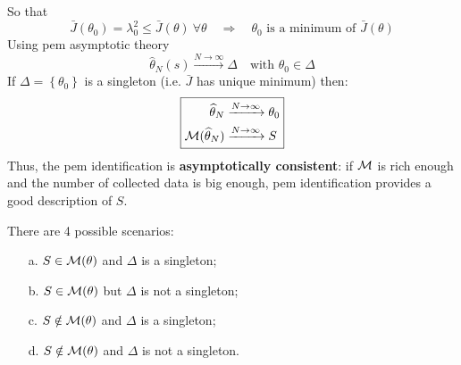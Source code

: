So that
\begin{equation*}
\bar{J}\left(\theta _{0}\right) = \lambda _{0}^{2} \leq \bar{J}(\theta)\  \forall \theta \quad\Longrightarrow\quad \theta _{0} \text{ is a minimum of } \bar{J}(\theta)
\end{equation*}
Using \gls{pem} asymptotic theory
\begin{equation*}
\hat{\theta}_{N}(s) \xrightarrow{N\to\infty} \Delta \quad \text{with }\theta_{0} \in \Delta 
\end{equation*}
If $ \Delta =\left\{\theta _{0}\right\}$ is a singleton (i.e. $ \bar{J}$ has unique minimum) then:
\[
	\boxed{
		\begin{aligned}
			\widehat{\theta }_{N} & \xrightarrow{N\rightarrow \infty} \theta _{0}\\
			\mathcal{M}(\widehat{\theta }_{N}) & \xrightarrow{N\rightarrow \infty} S
		\end{aligned}
	}
\]
Thus, the \gls{pem} identification is \textbf{asymptotically consistent}: if $ \mathcal{M}$ is rich enough and the number of collected data is big enough, \gls{pem} identification provides a good description of $ S$.

There are 4 possible scenarios:
\begin{enumerate}
    \item [a.] $S\in\mathcal{M}(\theta)$ and $\Delta$ is a singleton;
    \item [b.] $S\in\mathcal{M}(\theta)$ but $\Delta$ is not a singleton;
    \item [c.] $S\notin\mathcal{M}(\theta)$ and $\Delta$ is a singleton;
    \item [d.] $S\notin\mathcal{M}(\theta)$ and $\Delta$ is not a singleton.
\end{enumerate}

